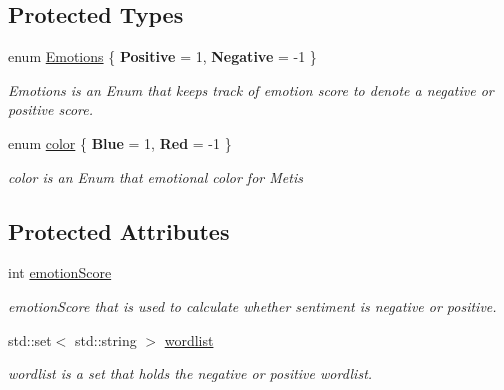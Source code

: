 \subsection*{Protected Types}
\begin{DoxyCompactItemize}
\item 
enum \hyperlink{classSentiment_a77da2ef7ddef68132cba46d8304a5ad1}{Emotions} \{ {\bfseries Positive} = 1, 
{\bfseries Negative} = -\/1
 \}
\begin{DoxyCompactList}\small\item\em Emotions is an Enum that keeps track of emotion score to denote a negative or positive score. \end{DoxyCompactList}\item 
enum \hyperlink{classSentiment_af2c0cb9660017b389d6d0865843742b2}{color} \{ {\bfseries Blue} = 1, 
{\bfseries Red} = -\/1
 \}
\begin{DoxyCompactList}\small\item\em color is an Enum that emotional color for Metis \end{DoxyCompactList}\end{DoxyCompactItemize}
\subsection*{Protected Attributes}
\begin{DoxyCompactItemize}
\item 
\hypertarget{classSentiment_a5a1779a5a705df433195ec737a4156ea}{int \hyperlink{classSentiment_a5a1779a5a705df433195ec737a4156ea}{emotion\-Score}}\label{classSentiment_a5a1779a5a705df433195ec737a4156ea}

\begin{DoxyCompactList}\small\item\em emotion\-Score that is used to calculate whether sentiment is negative or positive. \end{DoxyCompactList}\item 
\hypertarget{classSentiment_a177fabec96128aa37489b4db240535ae}{std\-::set$<$ std\-::string $>$ \hyperlink{classSentiment_a177fabec96128aa37489b4db240535ae}{wordlist}}\label{classSentiment_a177fabec96128aa37489b4db240535ae}

\begin{DoxyCompactList}\small\item\em wordlist is a set that holds the negative or positive wordlist. \end{DoxyCompactList}\end{DoxyCompactItemize}


